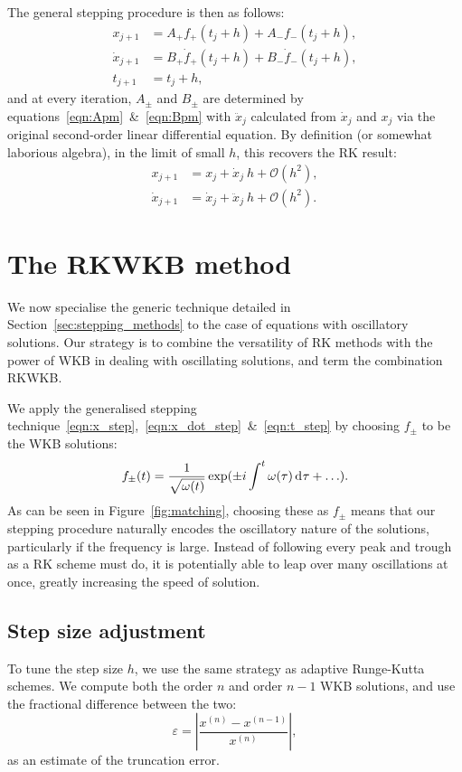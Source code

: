 The general stepping procedure is then as follows:
\begin{align}
  x_{j+1} &= A_+ f_+(t_j + h) + A_- f_-(t_j + h),
  \label{eqn:x_step} \\
  \dot{x}_{j+1} &= B_+ \dot{f}_+(t_j + h) + B_- \dot{f}_-(t_j + h),
  \label{eqn:x_dot_step} \\
  t_{j+1} &= t_j+h,
  \label{eqn:t_step}
\end{align}
and at every iteration, \(A_\pm\) and \(B_\pm\) are determined by equations~\eqref{eqn:Apm}~\&~\eqref{eqn:Bpm} with \(\ddot{x}_j\) calculated from \(\dot{x}_j\) and \(x_j\) via the original second-order linear differential equation. By definition (or somewhat laborious algebra), in the limit of small \(h\), this recovers the RK result:
\begin{align}
    x_{j+1} &= x_j + \dot{x}_j \: h + \mathcal{O}(h^2), \\
    \dot{x}_{j+1} &= \dot{x}_j  + \ddot{x}_j\: h + \mathcal{O}(h^2). 
\end{align}


\section{The RKWKB method}
\label{sec:rkwkb}
We now specialise the generic technique detailed in Section~\ref{sec:stepping_methods} to the case of equations with oscillatory solutions. Our strategy is to combine the versatility of RK methods with the power of WKB in dealing with oscillating solutions, and term the combination RKWKB\@. 

We apply the generalised stepping technique~\eqref{eqn:x_step},~\eqref{eqn:x_dot_step}~\&~\eqref{eqn:t_step} by choosing \(f_\pm\) to be the WKB solutions:
\begin{equation}
    f_\pm(t) = \frac{1}{\sqrt{\omega(t)}}\exp(\pm i \int^t \omega(\tau)\operatorname{d}^{}\!{\tau} +\ldots).
\end{equation}
As can be seen in Figure~\ref{fig:matching}, choosing these as \(f_\pm\) means that our stepping procedure naturally encodes the oscillatory nature of the solutions, particularly if the frequency is large. Instead of following every peak and trough as a RK scheme must do, it is potentially able to leap over many oscillations at once, greatly increasing the speed of solution.

\subsection{Step size adjustment}
To tune the step size \(h\), we use the same strategy as adaptive Runge-Kutta schemes. We compute both the order \(n\) and order \(n-1\) WKB solutions, and use the fractional difference between the two:
\begin{equation}
  \varepsilon = \left|\frac{x^{(n)}-x^{(n-1)}}{x^{(n)}}\right|,
\end{equation}
as an estimate of the truncation error. 

